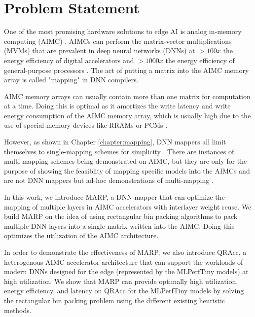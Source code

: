\chapter{Problem Statement}

One of the most promising hardware solutions to edge AI is analog in-memory computing (AIMC) \cite{sebastian2020memory}. AIMCs can perform the matrix-vector multiplications (MVMs) that are prevalent in deep neural networks (DNNs) at $>100x$ the energy efficiency of digital accelerators and $>1000x$ the energy efficiency of general-purpose processors \cite{shanbhag2022benchmarking}. The act of putting a matrix into the AIMC memory array is called "mapping" in DNN compilers.

AIMC memory arrays can usually contain more than one matrix for computation at a time. Doing this is optimal as it amortizes the write latency and write energy consumption of the AIMC memory array, which is usually high due to the use of special memory devices like RRAMs or PCMs \cite{meng2024compute}. 

However, as shown in Chapter \ref{chapter:mapping}, DNN mappers all limit themselves to single-mapping schemes for simplicity \cite{mei2021zigzag,symons2024stream,andrulis2024cimloop,lammie2024lionheart,chen2018neurosim}. There are instances of multi-mapping schemes being demonstrated on AIMC, but they are only for the purpose of showing the feasiblity of mapping specific models into the AIMCs and are not DNN mappers but ad-hoc demonstrations of multi-mapping \cite{houshmand2022diana,garofalo2022heterogeneous}. 

In this work, we introduce MARP, a DNN mapper that can optimize the mapping of multiple layers in AIMC accelerators with interlayer weight reuse. We build MARP on the idea of using rectangular bin packing algorithms to pack multiple DNN layers into a single matrix written into the AIMC. Doing this optimizes the utilization of the AIMC architecture.

In order to demonstrate the effectiveness of MARP, we also introduce QRAcc, a heterogenous AIMC accelerator architecture that can support the workloads of modern DNNs designed for the edge (represented by the MLPerfTiny models) at high utilization. We show that MARP can provide optimally high utilization, energy efficiency, and latency on QRAcc for the MLPerfTiny models by solving the rectangular bin packing problem using the different existing heuristic methods.
